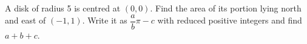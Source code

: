 A disk of radius 5 is centred at $(0,0)$. Find the area of its portion lying north and east of $(-1,1)$. Write it as $\dfrac{a}{b}\pi-c$ with reduced positive integers and find $a+b+c$.
